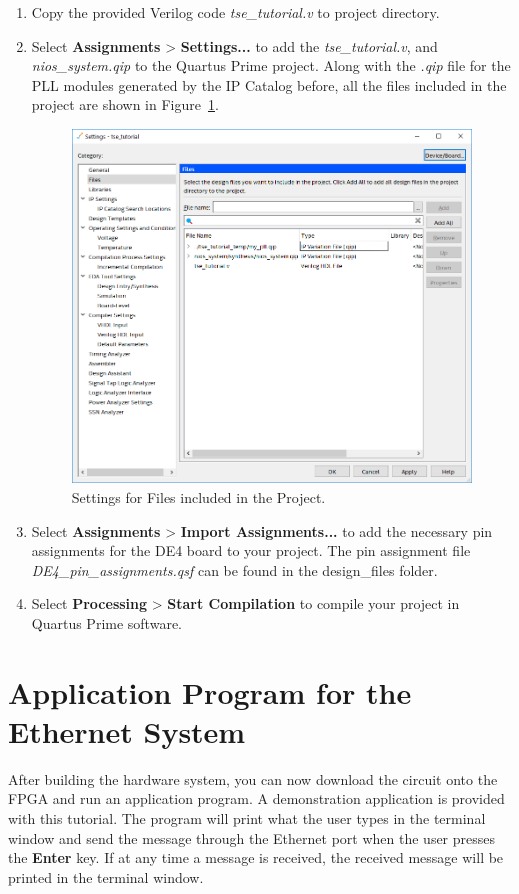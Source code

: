 \documentclass[11pt, twoside, pdftex]{article}
\begin{document}
\begin{enumerate}
	\item Copy the provided Verilog code {\it tse\_tutorial.v} to project directory.
	\item Select {\bf Assignments} > {\bf Settings...} to add the {\it tse\_tutorial.v}, and {\it nios\_system.qip} to the Quartus Prime project. Along with the {\it .qip} file for the PLL modules generated by the IP Catalog before, all the files included in the project are shown in Figure~\ref{fig:files_settings}. 
	
	\begin{figure}[H]
		\centering
		  \includegraphics[scale=0.6]{figures/files_settings.png}
		\caption{Settings for Files included in the Project.} 
		\label{fig:files_settings}
	\end{figure}
			
	\item Select {\bf Assignments} > {\bf Import Assignments...} to add the necessary pin assignments for the DE4 board to your project. The pin assignment file {\it DE4\_pin\_assignments.qsf} can be found in the design\_files folder.
	\item Select {\bf Processing} > {\bf Start Compilation} to compile your project in Quartus Prime software. 
\end{enumerate}


\section{Application Program for the Ethernet System}
After building the hardware system, you can now download the circuit onto the FPGA and run an application program. A demonstration application is provided with this tutorial. The program will print what the user types in the terminal window and send the message through the Ethernet port when the user presses the {\bf Enter} key. If at any time a message is received, the received message will be printed in the terminal window. 
\end{document}
